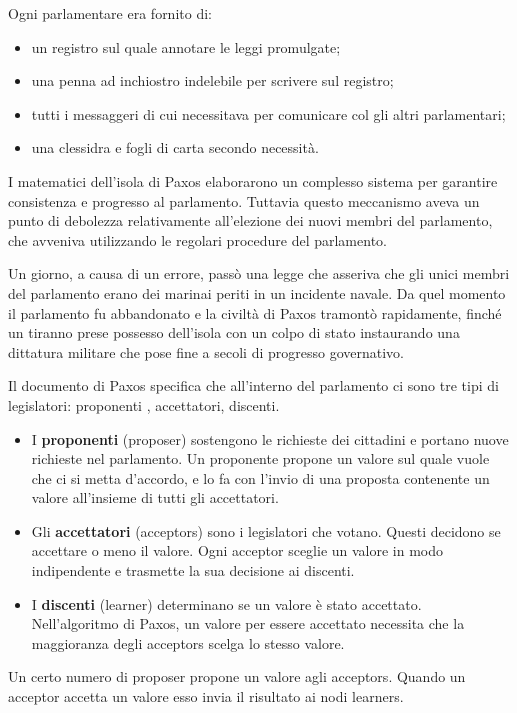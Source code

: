 Ogni parlamentare era fornito di:
\begin{itemize}
    \item un registro sul quale annotare le leggi promulgate;
    \item una penna ad inchiostro indelebile per scrivere sul registro;
    \item tutti i messaggeri di cui necessitava per comunicare col gli altri parlamentari;
    \item una clessidra e fogli di carta secondo necessità.
\end{itemize}
I matematici dell'isola di Paxos elaborarono un complesso sistema per garantire consistenza e progresso al parlamento. Tuttavia questo meccanismo aveva un punto di debolezza relativamente all'elezione dei nuovi membri del parlamento, che avveniva utilizzando le regolari procedure del parlamento. 

Un giorno, a causa di un errore, passò una legge che asseriva che gli unici membri del parlamento erano dei marinai periti in un incidente navale. Da quel momento il parlamento fu abbandonato e la civiltà di Paxos tramontò rapidamente, finché un tiranno prese possesso dell'isola con un colpo di stato instaurando una dittatura militare che pose fine a secoli di progresso governativo.

\vspace{5mm}

Il documento di Paxos specifica che all'interno del parlamento ci sono tre tipi di legislatori: proponenti , accettatori, discenti.
\begin{itemize}
    \item I \textbf{proponenti} (proposer) sostengono le richieste dei cittadini e portano nuove richieste nel parlamento. Un proponente propone un valore sul quale vuole che ci si metta d'accordo, e lo fa con l'invio di una proposta contenente un valore all'insieme di tutti gli accettatori.
    \item Gli \textbf{accettatori} (acceptors) sono i legislatori che votano. Questi decidono se accettare o meno il valore. Ogni acceptor sceglie un valore in modo indipendente e trasmette la sua decisione ai discenti.
    \item I \textbf{discenti} (learner) determinano se un valore è stato accettato. Nell'algoritmo di Paxos, un valore per essere accettato necessita che la maggioranza degli acceptors scelga lo stesso valore.
\end{itemize}
Un certo numero di proposer propone un valore agli acceptors. Quando un acceptor accetta un valore esso invia il risultato ai nodi learners.

